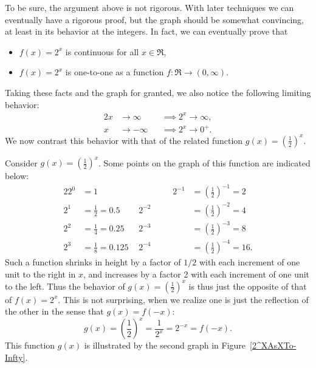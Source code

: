 To be sure, the argument above is not rigorous. With later techniques
we can eventually have a rigorous proof, but the
graph should be somewhat convincing, at least in its
behavior at the integers.  In fact, we can eventually
prove that
\begin{itemize}
\item $f(x)=2^x$ is continuous for all $x\in\Re$,
\item $f(x)=2^x$ is one-to-one as a function $f:\Re\longrightarrow(0,\infty)$.
\end{itemize}
Taking these facts and the
graph for granted, we also notice the following limiting
behavior:
\begin{alignat}{2}x&\longrightarrow\infty&&\implies 2^x
                \longrightarrow\infty,\label{2^XAsXToInfty}\\
               x&\longrightarrow-\infty&&\implies 2^x
                \longrightarrow 0^+.\label{2^XAsXTo-Infty}
\end{alignat}
We now contrast this behavior with that of 
the related function $g(x)=\left(\frac12\right)^x$.

\bex Consider $g(x)=\left(\frac12\right)^x$. Some points
on the graph of this function are indicated below:
\begin{alignat*}{2}
2^0&= 1\qquad\qquad&\qquad\qquad2^{-1} 
         &=\left(\frac12\right)^{-1}=2\\
2^1&= \frac12=0.5&2^{-2}
         &=\left(\frac12\right)^{-2}=4\\
2^2&= \frac14=0.25&2^{-3}
         &=\left(\frac12\right)^{-3}=8\\
2^3&= \frac18=0.125&2^{-4}
         &=\left(\frac12\right)^{-4}=16.
\end{alignat*}
Such a function shrinks in height by a factor of $1/2$ 
with each increment of one unit to the right in $x$, and
increases by a factor 2 with each increment of one unit to the left.
Thus the behavior of $g(x)=\left(\frac12\right)^x$ is thus just the
opposite of that of $f(x)=2^x$.  This is not surprising, when
we realize one is just the reflection of the other in the sense that
$g(x)=f(-x)$:
$$g(x)=\left(\frac12\right)^x=\frac1{2^x}=2^{-x}=f(-x).$$
This function $g(x)$ is illustrated by the second graph in 
Figure~\ref{2^XAsXTo-Infty}.
\eex

